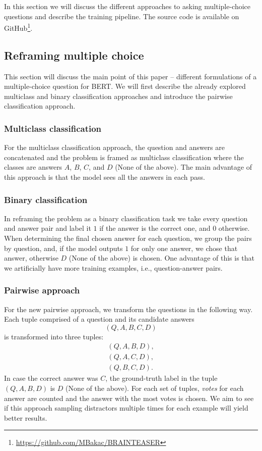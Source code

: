 In this section we will discuss the different approaches to asking multiple-choice questions and describe the training pipeline.
The source code is available on GitHub\footnote[3]{\url{https://github.com/MBakac/BRAINTEASER}}.
\subsection{Reframing multiple choice}
This section will discuss the main point of this paper -- different formulations of a multiple-choice question for BERT.
We will first describe the already explored multiclass and binary classification approaches and introduce the pairwise classification approach.

\subsubsection{Multiclass classification}
For the multiclass classification approach, the question and answers are concatenated and the problem is framed as multiclass classification where the classes are answers $A$, $B$, $C$, and $D$ (None of the above).
The main advantage of this approach is that the model sees all the answers in each pass.

\subsubsection{Binary classification}
In reframing the problem as a binary classification task we take every question and answer pair and label it $1$ if the answer is the correct one, and $0$ otherwise.
When determining the final chosen answer for each question, we group the pairs by question, and, if the model outputs $1$ for only one answer, we chose that answer, otherwise $D$ (None of the above) is chosen.
One advantage of this is that we artificially have more training examples, i.e., question-answer pairs.

\subsubsection{Pairwise approach}
For the new pairwise approach, we transform the questions in the following way.
Each tuple comprised of a question and its candidate answers
$$
    (Q,A,B,C,D)
$$
is transformed into three tuples:
\begin{align*}
       (Q,A,B,D), \\
       (Q,A,C,D), \\
       (Q,B,C,D).
\end{align*}
In case the correct answer was $C$, the ground-truth label in the tuple $(Q,A,B,D)$ is $D$ (None of the above).
For each set of tuples, \emph{votes} for each answer are counted and the answer with the most votes is chosen.
We aim to see if this approach sampling distractors multiple times for each example will yield better results.

